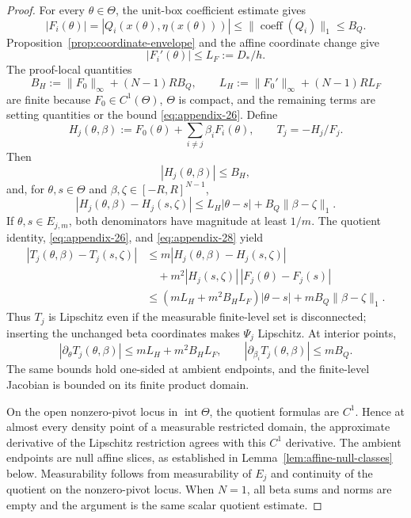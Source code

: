 \begin{proof}
For every $\theta\in\Theta$, the unit-box coefficient estimate gives
\begin{equation}
|F_i(\theta)|
=|Q_i(x(\theta),\eta(x(\theta)))|
\leq\|\operatorname{coeff}(Q_i)\|_1
\leq B_Q.
\label{eq:appendix-25}
\end{equation}
Proposition~\ref{prop:coordinate-envelope} and the affine coordinate change
give
\begin{equation}
|F_i'(\theta)|\leq L_F:=D_*/h.
\label{eq:appendix-26}
\end{equation}
The proof-local quantities
\begin{equation}
B_H:=\|F_0\|_\infty+(N-1)RB_Q,
\qquad
L_H:=\|F_0'\|_\infty+(N-1)RL_F
\label{eq:appendix-27}
\end{equation}
are finite because $F_0\in C^1(\Theta)$, $\Theta$ is compact, and the
remaining terms are setting quantities or the bound \eqref{eq:appendix-26}.  Define
\[
H_j(\theta,\beta)
:=F_0(\theta)+\sum_{i\neq j}\beta_iF_i(\theta),
\qquad
T_j=-H_j/F_j.
\]
Then
\[
|H_j(\theta,\beta)|\leq B_H,
\]
and, for $\theta,s\in\Theta$ and
$\beta,\zeta\in[-R,R]^{N-1}$,
\begin{equation}
|H_j(\theta,\beta)-H_j(s,\zeta)|
\leq L_H|\theta-s|+B_Q\|\beta-\zeta\|_1.
\label{eq:appendix-28}
\end{equation}
If $\theta,s\in E_{j,m}$, both denominators have magnitude at least $1/m$.
The quotient identity, \eqref{eq:appendix-26}, and \eqref{eq:appendix-28} yield
\begin{equation}
\begin{aligned}
|T_j(\theta,\beta)-T_j(s,\zeta)|
&\leq m|H_j(\theta,\beta)-H_j(s,\zeta)|\\
&\quad+m^2|H_j(s,\zeta)|\,|F_j(\theta)-F_j(s)|\\
&\leq(mL_H+m^2B_HL_F)|\theta-s|
 +mB_Q\|\beta-\zeta\|_1.
\end{aligned}
\label{eq:appendix-29}
\end{equation}
Thus $T_j$ is Lipschitz even if the measurable finite-level set is
disconnected; inserting the unchanged beta coordinates makes $\Psi_j$
Lipschitz.  At interior points,
\begin{equation}
|\partial_\theta T_j(\theta,\beta)|
\leq mL_H+m^2B_HL_F,
\qquad
|\partial_{\beta_i}T_j(\theta,\beta)|
\leq mB_Q.
\label{eq:appendix-30}
\end{equation}
The same bounds hold one-sided at ambient endpoints, and the finite-level
Jacobian is bounded on its finite product domain.

On the open nonzero-pivot locus in $\operatorname{int}\Theta$, the quotient
formulas are $C^1$.  Hence at almost every density point of a measurable
restricted domain, the approximate derivative of the Lipschitz restriction
agrees with this $C^1$ derivative.  The ambient endpoints are null affine
slices, as established in Lemma~\ref{lem:affine-null-classes} below.
Measurability follows from measurability of $E_j$ and continuity of the
quotient on the nonzero-pivot locus.  When $N=1$, all beta sums and norms are
empty and the argument is the same scalar quotient estimate.
\end{proof}

